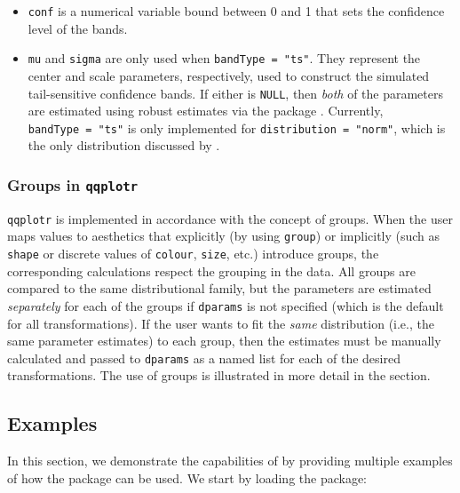 \begin{itemize}
\item
  \texttt{conf} is a numerical variable bound between 0 and 1 that sets
  the confidence level of the bands.
\item
  \texttt{mu} and \texttt{sigma} are only used when
  \texttt{bandType\ =\ "ts"}. They represent the center and scale
  parameters, respectively, used to construct the simulated
  tail-sensitive confidence bands. If either is \texttt{NULL}, then
  \emph{both} of the parameters are estimated using robust estimates via
  the  package \citep{robustbase}. Currently,
  \texttt{bandType\ =\ "ts"} is only implemented for
  \texttt{distribution\ =\ "norm"}, which is the only distribution
  discussed by \citet{Aldor-Noiman2013-xw}.
\end{itemize}

\subsubsection{\texorpdfstring{Groups in
\texttt{qqplotr}}{Groups in qqplotr}}\label{groups-in-qqplotr}

\texttt{qqplotr} is implemented in accordance with the 
concept of groups. When the user maps values to aesthetics that
explicitly (by using \texttt{group}) or implicitly (such as
\texttt{shape} or discrete values of \texttt{colour}, \texttt{size},
etc.) introduce groups, the corresponding calculations respect the
grouping in the data. All groups are compared to the same distributional
family, but the parameters are estimated \emph{separately} for each of
the groups if \texttt{dparams} is not specified (which is the default
for all transformations). If the user wants to fit the \emph{same}
distribution (i.e., the same parameter estimates) to each group, then
the estimates must be manually calculated and passed to \texttt{dparams}
as a named list for each of the desired  transformations.
The use of groups is illustrated in more detail in the
 section.

\FloatBarrier

\subsection{Examples}\label{examples}

\label{sec:examples}

In this section, we demonstrate the capabilities of  by
providing multiple examples of how the package can be used. We start by
loading the package:

